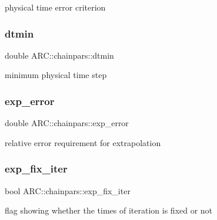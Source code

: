 physical time error criterion 

\hypertarget{classARC_1_1chainpars_ac414014d19915aecb35245ba11649c2e}{}\label{classARC_1_1chainpars_ac414014d19915aecb35245ba11649c2e} 
\subsubsection{\texorpdfstring{dtmin}{dtmin}}
{\footnotesize\ttfamily double A\+R\+C\+::chainpars\+::dtmin}



minimum physical time step 

\hypertarget{classARC_1_1chainpars_a7ee477ebe8b1d67457891ab58560c074}{}\label{classARC_1_1chainpars_a7ee477ebe8b1d67457891ab58560c074} 
\subsubsection{\texorpdfstring{exp\+\_\+error}{exp\_error}}
{\footnotesize\ttfamily double A\+R\+C\+::chainpars\+::exp\+\_\+error}



relative error requirement for extrapolation 

\hypertarget{classARC_1_1chainpars_a3f16e6ea9497e294265c4a17df0394ba}{}\label{classARC_1_1chainpars_a3f16e6ea9497e294265c4a17df0394ba} 
\subsubsection{\texorpdfstring{exp\+\_\+fix\+\_\+iter}{exp\_fix\_iter}}
{\footnotesize\ttfamily bool A\+R\+C\+::chainpars\+::exp\+\_\+fix\+\_\+iter}



flag showing whether the times of iteration is fixed or not 

\hypertarget{classARC_1_1chainpars_a91a648cc6e52054cecad54a29dc5e9a1}{}\label{classARC_1_1chainpars_a91a648cc6e52054cecad54a29dc5e9a1} 
